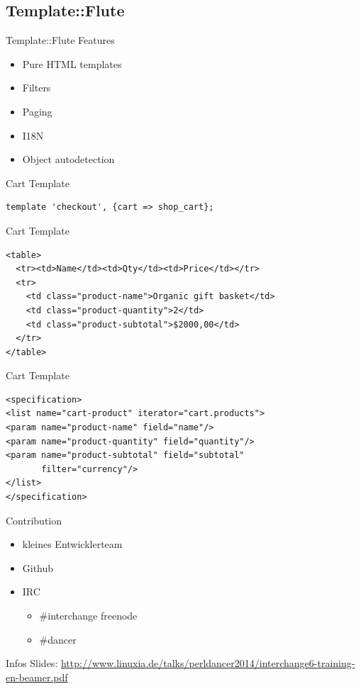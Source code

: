 \subsection{Template::Flute}
\begin{frame}{Template::Flute Features}
\begin{itemize}
\item Pure HTML templates
\item Filters
\item Paging
\item I18N
\item Object autodetection
\end{itemize}
\end{frame}

\begin{frame}[fragile]{Cart Template}
\begin{lstlisting}
template 'checkout', {cart => shop_cart};
\end{lstlisting}
\end{frame}

\begin{frame}[fragile]{Cart Template}
\begin{lstlisting}
<table>
  <tr><td>Name</td><td>Qty</td><td>Price</td></tr>
  <tr>
    <td class="product-name">Organic gift basket</td>
    <td class="product-quantity">2</td>
    <td class="product-subtotal">$2000,00</td>
  </tr>
</table>
\end{lstlisting}
\end{frame}

\begin{frame}[fragile]{Cart Template}
\begin{lstlisting}
<specification>
<list name="cart-product" iterator="cart.products">
<param name="product-name" field="name"/>
<param name="product-quantity" field="quantity"/>
<param name="product-subtotal" field="subtotal" 
       filter="currency"/>
</list>
</specification>
\end{lstlisting}
\end{frame}

\begin{frame}{Contribution}
\begin{itemize}
\item kleines Entwicklerteam
\item Github
\item IRC 
\begin{itemize}
\item \#interchange freenode
\item \#dancer
\end{itemize}
\end{itemize}
\end{frame}

\begin{frame}{Infos}
Slides:
\url{http://www.linuxia.de/talks/perldancer2014/interchange6-training-en-beamer.pdf}
\end{frame}




